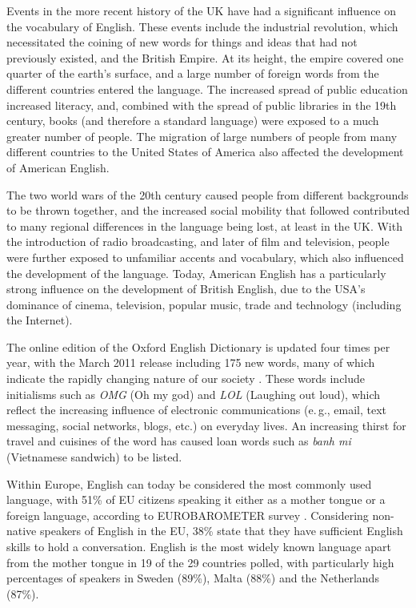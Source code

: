 \documentclass[]{../../metanetpaper}
\begin{document}
\begin{multicols}{2}
Events in the more recent history of the UK have had a significant influence on the vocabulary of English. These events include the industrial revolution, which necessitated the coining of new words for things and ideas that had not previously existed, and the British Empire. At its height, the empire covered one quarter of the earth's surface, and a large number of foreign words from the different countries entered the language. The increased spread of public education increased literacy, and, combined with the spread of public libraries in the 19th century, books (and therefore a standard language) were exposed to a much greater number of people. The migration of large numbers of people from many different countries to the United States of America also affected the development of American English. 

The two world wars of the 20th century caused people from different backgrounds to be thrown together, and the increased social mobility that followed contributed to many regional differences in the language being lost, at least in the UK. With the introduction of radio broadcasting, and later of film and television, people were further exposed to unfamiliar accents and vocabulary, which also influenced the development of the language. Today, American English has a particularly strong influence on the development of British English, due to the USA's dominance of cinema, television, popular music, trade and technology (including the Internet).
    
     
The online edition of the Oxford English Dictionary is updated four times per year, with the March 2011 release including 175 new words, many of which indicate the rapidly changing nature of our society \cite{oed}. These words include initialisms such as \textit{OMG} (Oh my god) and \textit{LOL} (Laughing out loud), which reflect the increasing influence of electronic communications (e.\,g., email, text messaging, social networks, blogs, etc.) on everyday lives. An increasing thirst for travel and cuisines of the word has caused loan words such as \textit{banh mi} (Vietnamese sandwich) to be listed. 
    
             
Within Europe, English can today be considered the most commonly used language, with 51\% of EU citizens speaking it either as a mother tongue or a foreign language, according to EUROBAROMETER survey \cite{europa}. Considering non-native speakers of English in the EU, 38\% state that they have sufficient English skills to hold a conversation. English is the most widely known language apart from the mother tongue in 19 of the 29 countries polled, with particularly high percentages of speakers in Sweden (89\%), Malta (88\%) and the Netherlands (87\%).
    

\end{multicols}
\end{document}

